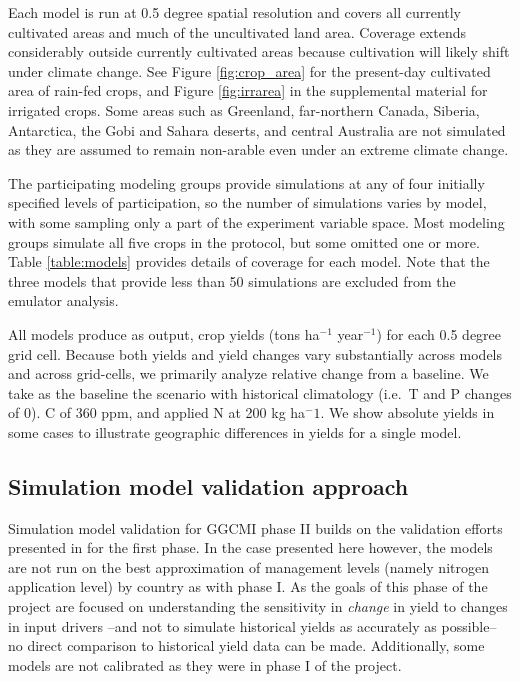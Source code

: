 \documentclass[preprint, 5p, times, twocolumn]{elsarticle}
\begin{document}
Each model is run at 0.5 degree spatial resolution and covers all currently cultivated areas and much of the uncultivated land area.  Coverage extends considerably outside currently cultivated areas because cultivation will likely shift under climate change. See Figure \ref{fig:crop_area} for the present-day cultivated area of rain-fed crops, and Figure \ref{fig:irrarea} in the supplemental material for irrigated crops. Some areas such as Greenland, far-northern Canada, Siberia, Antarctica, the Gobi and Sahara deserts, and central Australia are not simulated as they are assumed to remain non-arable even under an extreme climate change.  

The participating modeling groups provide simulations at any of four initially specified levels of participation, so the number of simulations varies by model, with some sampling only a part of the experiment variable space. Most modeling groups simulate all five crops in the protocol, but some omitted one or more. Table \ref{table:models} provides details of coverage for each model. Note that the three models that provide less than 50 simulations are excluded from the emulator analysis. 

All models produce as output, crop yields (tons ha$^{-1}$ year$^{-1}$) for each 0.5 degree grid cell. Because both yields and yield changes vary substantially across models and across grid-cells, we primarily analyze relative change from a baseline. We take as the baseline the scenario with historical climatology (i.e.\ T and P changes of 0). C of 360 ppm, and applied N at 200 kg ha$^-1$.  We show absolute yields in some cases to illustrate geographic differences in yields for a single model. 

\subsection{Simulation model validation approach}
Simulation model validation for GGCMI phase II builds on the validation efforts presented in \citet{muller_global_2017} for the first phase. In the case presented here however, the models are not run on the best approximation of management levels (namely nitrogen application level) by country as with phase I. As the goals of this phase of the project are focused on understanding the sensitivity in \textit{change} in yield to changes in input drivers --and not to simulate historical yields as accurately as possible-- no direct comparison to historical yield data can be made. Additionally, some models are not calibrated as they were in phase I of the project. 
\end{document}
